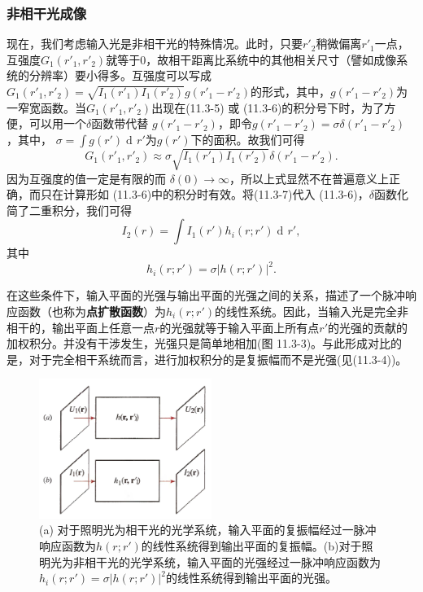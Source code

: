 \documentclass[UTF8]{ctexart}
\numberwithin{figure}{subsection}
\numberwithin{table}{subsection}
\DeclareMathOperator\dif{d\!}
\begin{document}
\subsubsection{非相干光成像}
\endgroup
现在，我们考虑输入光是非相干光的特殊情况。此时，只要$r'_2$稍微偏离$r'_1$一点，互强度$G_1 (r'_1, r'_2)$就等于0，故相干距离比系统中的其他相关尺寸（譬如成像系统的分辨率）要小得多。互强度可以写成$G_1 (r'_1, r'_2) = \sqrt{I_1 (r'_1) I_1(r'_2)} g(r'_1 - r'_2)$的形式，其中，$g(r'_1 - r'_2)$为一窄宽函数。当$G_1 (r'_1, r'_2)$出现在(11.3-5) 或 (11.3-6)的积分号下时，为了方便，可以用一个$\delta$函数带代替 $g(r'_1 - r'_2)$，即令$g(r'_1 - r'_2) = \sigma \delta (r'_1 - r'_2)$，其中，  $\sigma = \int g(r') \dif r'$为$g(r')$下的面积。故我们可得
\begin{equation}
G_1 (r'_1, r'_2) \approx \sigma \sqrt{I_1 (r'_1) I_1 (r'_2)} \delta (r'_1 - r'_2) .
\end{equation}
因为互强度的值一定是有限的而 $\delta (0) \to \infty$，所以上式显然不在普遍意义上正确，而只在计算形如 (11.3-6)中的积分时有效。将(11.3-7)代入 (11.3-6)，$\delta$函数化简了二重积分，我们可得
\begin{equation}
I_2 (r) = \int I_1 (r') h_i (r; r') \dif r' ,
\end{equation}
其中
\begin{equation}
h_i (r; r') = \sigma \lvert h(r; r') \rvert ^2 .
\end{equation}
\par 在这些条件下，输入平面的光强与输出平面的光强之间的关系，描述了一个脉冲响应函数（也称为\textbf{点扩散函数}）为$h_i (r; r')$的线性系统。因此，当输入光是完全非相干的，输出平面上任意一点$r$的光强就等于输入平面上所有点$r'$的光强的贡献的加权积分。并没有干涉发生，光强只是简单地相加(图 11.3-3)。与此形成对比的是，对于完全相干系统而言，进行加权积分的是复振幅而不是光强(见(11.3-4))。
\begin{figure}[H]
\centering
\includegraphics[width=0.5\textwidth]{11_3_3.PNG}
\caption{(a) 对于照明光为相干光的光学系统，输入平面的复振幅经过一脉冲响应函数为$h(r; r')$的线性系统得到输出平面的复振幅。(b)对于照明光为非相干光的光学系统，输入平面的光强经过一脉冲响应函数为$h_i (r; r') = \sigma \lvert h(r; r') \rvert ^2$的线性系统得到输出平面的光强。}
\label{fig: 11_3_3}
\end{figure}
\end{document}
